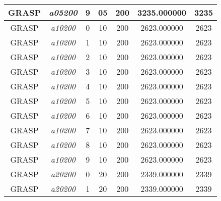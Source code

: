 {\begin{longtable}{cc|c|cc|cc}
			GRASP              & \textit{a05200}    & 9                               & 05               & 200              & 3235.000000                          & 3235 \\ \hline
			GRASP              & \textit{a10200}    & 0                               & 10               & 200              & 2623.000000                          & 2623 \\ 
			GRASP              & \textit{a10200}    & 1                               & 10               & 200              & 2623.000000                          & 2623 \\ 
			GRASP              & \textit{a10200}    & 2                               & 10               & 200              & 2623.000000                          & 2623 \\ 
			GRASP              & \textit{a10200}    & 3                               & 10               & 200              & 2623.000000                          & 2623 \\ 
			GRASP              & \textit{a10200}    & 4                               & 10               & 200              & 2623.000000                          & 2623 \\ 
			GRASP              & \textit{a10200}    & 5                               & 10               & 200              & 2623.000000                          & 2623 \\ 
			GRASP              & \textit{a10200}    & 6                               & 10               & 200              & 2623.000000                          & 2623 \\ 
			GRASP              & \textit{a10200}    & 7                               & 10               & 200              & 2623.000000                          & 2623 \\ 
			GRASP              & \textit{a10200}    & 8                               & 10               & 200              & 2623.000000                          & 2623 \\ 
			GRASP              & \textit{a10200}    & 9                               & 10               & 200              & 2623.000000                          & 2623 \\ \hline
			GRASP              & \textit{a20200}    & 0                               & 20               & 200              & 2339.000000                          & 2339 \\ 
			GRASP              & \textit{a20200}    & 1                               & 20               & 200              & 2339.000000                          & 2339 \\ 

\end{longtable}}
